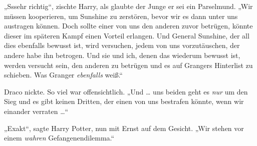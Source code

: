 „Sssehr richtig“, zischte Harry, als glaubte der Junge er sei ein Parselmund.
„Wir müssen kooperieren, um Sunshine zu zerstören, bevor wir es dann unter uns austragen können. Doch sollte einer von uns den anderen zuvor betrügen, könnte dieser im späteren Kampf einen Vorteil erlangen. Und General Sunshine, der all dies ebenfalls bewusst ist, wird versuchen, jedem von uns vorzutäuschen, der andere habe ihn betrogen. Und sie und ich, denen das wiederum bewusst ist, werden versucht sein, den anderen zu betrügen und es auf Grangers Hinterlist zu schieben. Was Granger \emph{ebenfalls} weiß.“

Draco nickte. So viel war offensichtlich.
„Und … uns beiden geht es \emph{nur} um den Sieg und es gibt keinen Dritten, der einen von uns bestrafen könnte, wenn wir einander verraten …“

„Exakt“, sagte Harry Potter, nun mit Ernst auf dem Gesicht.
„Wir stehen vor einem \emph{wahren} Gefangenendilemma.“

